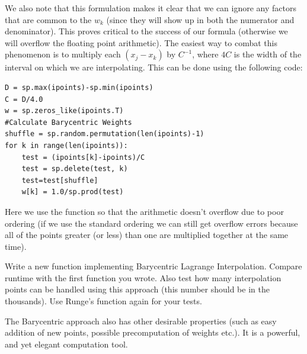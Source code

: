 We also note that this formulation makes it clear that we can ignore any factors that are common to the $w_k$ (since they will show up in both the numerator and denominator). This proves critical to the success of our formula (otherwise we will overflow the floating point arithmetic). The easiest way to combat this phenomenon is to multiply each $(x_j-x_k)$ by $C^{-1}$, where $4C$ is the width of the interval on which we are interpolating. This can be done using the following code:

\begin{lstlisting}[style=python]
D = sp.max(ipoints)-sp.min(ipoints)
C = D/4.0
w = sp.zeros_like(ipoints.T)
#Calculate Barycentric Weights
shuffle = sp.random.permutation(len(ipoints)-1)
for k in range(len(ipoints)):
    test = (ipoints[k]-ipoints)/C
    test = sp.delete(test, k)
    test=test[shuffle]
    w[k] = 1.0/sp.prod(test)
\end{lstlisting}

Here we use the  function so that the arithmetic doesn't overflow due to poor ordering (if we use the standard ordering we can still get overflow errors because all of the points greater (or less) than one are multiplied together at the same time).

\begin{problem}
Write a new function implementing Barycentric Lagrange Interpolation. Compare runtime with the first function you wrote. Also test how many interpolation points can be handled using this approach (this number should be in the thousands). Use Runge's function again for your tests.
\end{problem}

The Barycentric approach also has other desirable properties (such as easy addition of new points, possible precomputation of weights etc.). It is a powerful, and yet elegant computation tool.